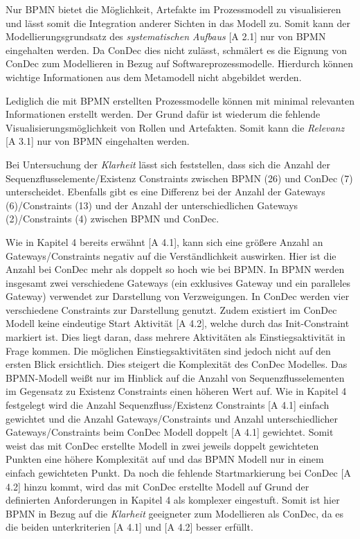 Nur BPMN bietet die Möglichkeit, Artefakte im Prozessmodell zu visualisieren und lässt somit die Integration anderer Sichten in das Modell zu. Somit kann der Modellierungsgrundsatz des \textit{systematischen Aufbaus} [A 2.1] nur von BPMN eingehalten werden. Da ConDec dies nicht zulässt, schmälert es die Eignung von ConDec zum Modellieren in Bezug auf Softwareprozessmodelle. Hierdurch können wichtige Informationen aus dem Metamodell nicht abgebildet werden. \newline 

Lediglich die mit BPMN erstellten Prozessmodelle können mit minimal relevanten Informationen erstellt werden. Der Grund dafür ist wiederum die fehlende Visualisierungsmöglichkeit von Rollen und Artefakten. Somit kann die \textit{Relevanz} [A 3.1] nur von BPMN eingehalten werden.\newline

Bei Untersuchung der \textit{Klarheit} lässt sich feststellen, dass sich die Anzahl der Sequenzflusselemente/Existenz Constraints zwischen BPMN (26) und ConDec (7) unterscheidet. Ebenfalls gibt es eine Differenz bei der Anzahl der Gateways (6)/Constraints (13) und der Anzahl der unterschiedlichen Gateways (2)/Constraints (4) zwischen BPMN und ConDec.\newline

Wie in Kapitel 4 bereits erwähnt [A 4.1], kann sich eine größere Anzahl an Gateways/Constraints negativ auf die Verständlichkeit auswirken. Hier ist die Anzahl bei ConDec mehr als doppelt so hoch wie bei BPMN. In BPMN werden insgesamt zwei verschiedene Gateways (ein exklusives Gateway und ein paralleles Gateway) verwendet zur Darstellung von Verzweigungen. In ConDec werden vier verschiedene Constraints zur Darstellung genutzt. Zudem existiert im ConDec Modell keine eindeutige Start Aktivität [A 4.2], welche durch das Init-Constraint markiert ist. Dies liegt daran, dass mehrere Aktivitäten als Einstiegsaktivität in Frage kommen. Die möglichen Einstiegsaktivitäten sind jedoch nicht auf den ersten Blick ersichtlich. Dies steigert die Komplexität des ConDec Modelles. \newline
 Das BPMN-Modell weißt nur im Hinblick auf die Anzahl von Sequenzflusselementen im Gegensatz zu Existenz Constraints einen höheren Wert auf. Wie in Kapitel 4 festgelegt wird die Anzahl Sequenzfluss/Existenz Constraints [A 4.1] einfach gewichtet und die Anzahl Gateways/Constraints und Anzahl unterschiedlicher Gateways/Constraints beim ConDec Modell doppelt [A 4.1] gewichtet. Somit weist das mit ConDec erstellte Modell in zwei jeweils doppelt gewichteten Punkten eine höhere Komplexität auf und das BPMN Modell nur in einem einfach gewichteten Punkt. Da noch die fehlende Startmarkierung bei ConDec [A 4.2] hinzu kommt, wird das mit ConDec erstellte Modell auf Grund der definierten Anforderungen in Kapitel 4 als komplexer eingestuft.
\newline
Somit ist hier BPMN in Bezug auf die \textit{Klarheit} geeigneter zum Modellieren als ConDec, da es die beiden unterkriterien [A 4.1] und [A 4.2] besser erfüllt.\newline

